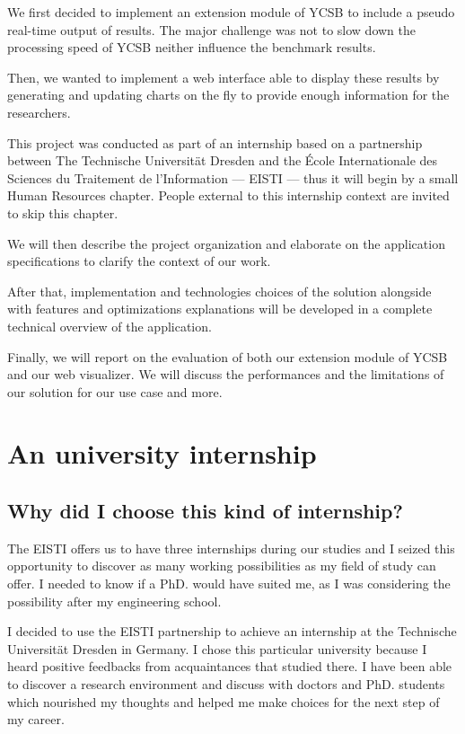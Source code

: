 \documentclass[a4paper,11pt]{report}
\begin{document}
We first decided to implement an extension module of YCSB to include a pseudo real-time output of results. The major challenge was not to slow down the processing speed of YCSB neither influence the benchmark results. 

Then, we wanted to implement a web interface able to display these results by generating and updating charts on the fly to provide enough information for the researchers.

\bigskip

This project was conducted as part of an internship based on a partnership between The Technische Universität Dresden and the École Internationale des Sciences du Traitement de l'Information --- EISTI --- thus it will begin by a small Human Resources chapter. People external to this internship context are invited to skip this chapter.

We will then describe the project organization and elaborate on the application specifications to clarify the context of our work.

After that, implementation and technologies choices of the solution alongside with features and optimizations explanations will be developed in a complete technical overview of the application.

Finally, we will report on the evaluation of both our extension module of YCSB and our web visualizer. We will discuss the performances and the limitations of our solution for our use case and more.

\newpage

\chapter{An university internship}\label{partnership}

\section{Why did I choose this kind of internship?}

The EISTI offers us to have three internships during our studies and I seized this opportunity to discover as many working possibilities as my field of study can offer. I needed to know if a PhD. would have suited me, as I was considering the possibility after my engineering school.

\bigskip

I decided to use the EISTI partnership to achieve an internship at the Technische Universität Dresden in Germany. I chose this particular university because I heard positive feedbacks from acquaintances that studied there. I have been able to discover a research environment and discuss with doctors and PhD. students which nourished my thoughts and helped me make choices for the next step of my career.
\end{document}

